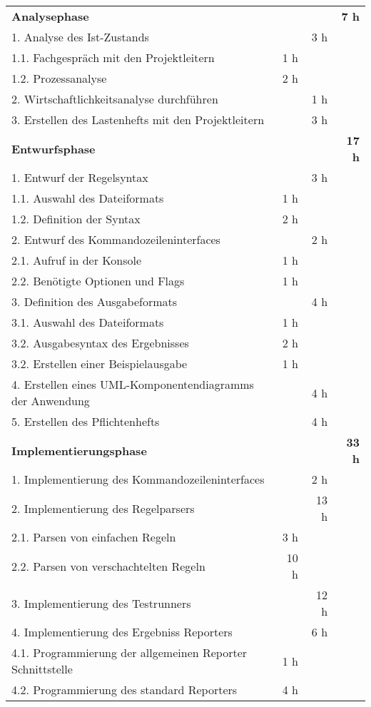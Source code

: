 \begin{tabularx}{\textwidth}{Xrrr}
\rowcolor{heading}\textbf{Analysephase} & \textbf{} & \textbf{} & \textbf{7 h} \\
1. Analyse des Ist-Zustands &       & 3 h   &  \\
\rowcolor{odd}1.1. Fachgespräch mit den Projektleitern & 1 h   &       &  \\
1.2. Prozessanalyse & 2 h   &       &  \\
\rowcolor{odd}2. Wirtschaftlichkeitsanalyse durchführen &       & 1 h   &  \\
3. Erstellen des Lastenhefts mit den Projektleitern &       & 3 h   &  \\


\rowcolor{heading}\textbf{Entwurfsphase} & \textbf{} & \textbf{} & \textbf{17 h} \\
1. Entwurf der Regelsyntax &       & 3 h   &  \\
\rowcolor{odd}1.1. Auswahl des Dateiformats & 1 h & & \\
1.2. Definition der Syntax 	&	2 h & 	& \\
\rowcolor{odd}2. Entwurf des Kommandozeileninterfaces &       & 2 h   &  \\
2.1. Aufruf in der Konsole & 1 h &	& \\
\rowcolor{odd}2.2. Benötigte Optionen und Flags 	& 1 h 	&  &\\
3. Definition des Ausgabeformats &       & 4 h   &  \\
\rowcolor{odd}3.1. Auswahl des Dateiformats & 1 h   &       &  \\
3.2. Ausgabesyntax des Ergebnisses & 2 h &  & \\
\rowcolor{odd}3.2. Erstellen einer Beispielausgabe & 1 h &  & \\
4. Erstellen eines UML-Komponentendiagramms der Anwendung &       & 4 h   &  \\
\rowcolor{odd}5. Erstellen des Pflichtenhefts &       & 4 h   &  \\


\rowcolor{heading}\textbf{Implementierungsphase} & \textbf{} & \textbf{} & \textbf{33 h} \\
1. Implementierung des Kommandozeileninterfaces		&		&		2 h		& \\
\rowcolor{odd}2. Implementierung des Regelparsers &		&		13 h		& \\
2.1. Parsen von einfachen Regeln		&		3 h		&		&	\\
\rowcolor{odd}2.2. Parsen von verschachtelten Regeln 		&		10 h		&		&	\\
3. Implementierung des Testrunners	&		&		12 h 	& \\
\rowcolor{odd}4. Implementierung des Ergebniss Reporters 	&		&		6 h 	& \\
4.1. Programmierung der allgemeinen Reporter Schnittstelle	&		1 h	&		& \\
\rowcolor{odd}4.2. Programmierung des standard Reporters 	&		4 h	&		&	\\


\end{tabularx}
